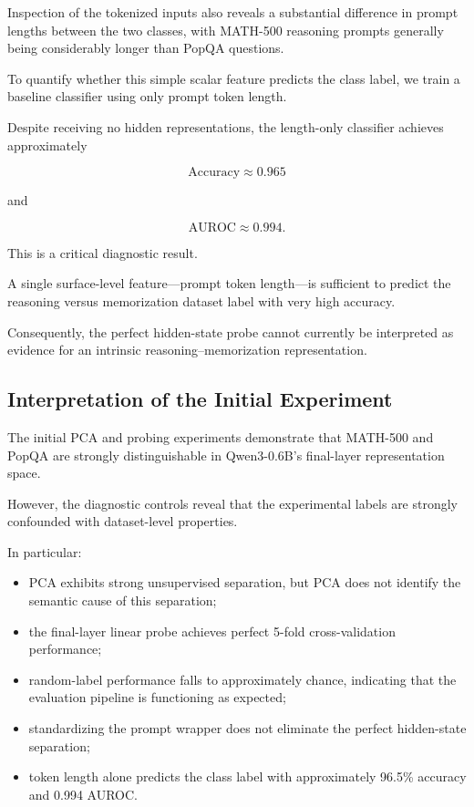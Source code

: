 \documentclass[11pt]{article}
\begin{document}
Inspection of the tokenized inputs also reveals a substantial
difference in prompt lengths between the two classes, with MATH-500
reasoning prompts generally being considerably longer than PopQA
questions.

To quantify whether this simple scalar feature predicts the class
label, we train a baseline classifier using only prompt token length.

Despite receiving no hidden representations, the length-only
classifier achieves approximately

\[
\mathrm{Accuracy}\approx0.965
\]

and

\[
\mathrm{AUROC}\approx0.994.
\]

This is a critical diagnostic result.

A single surface-level feature---prompt token length---is sufficient
to predict the reasoning versus memorization dataset label with very
high accuracy.

Consequently, the perfect hidden-state probe cannot currently be
interpreted as evidence for an intrinsic reasoning--memorization
representation.


\subsection{Interpretation of the Initial Experiment}

The initial PCA and probing experiments demonstrate that MATH-500 and
PopQA are strongly distinguishable in Qwen3-0.6B's final-layer
representation space.

However, the diagnostic controls reveal that the experimental labels
are strongly confounded with dataset-level properties.

In particular:

\begin{itemize}

    \item PCA exhibits strong unsupervised separation, but PCA does not
    identify the semantic cause of this separation;

    \item the final-layer linear probe achieves perfect 5-fold
    cross-validation performance;

    \item random-label performance falls to approximately chance,
    indicating that the evaluation pipeline is functioning as
    expected;

    \item standardizing the prompt wrapper does not eliminate the
    perfect hidden-state separation;

    \item token length alone predicts the class label with
    approximately 96.5\% accuracy and 0.994 AUROC.

\end{itemize}
\end{document}
